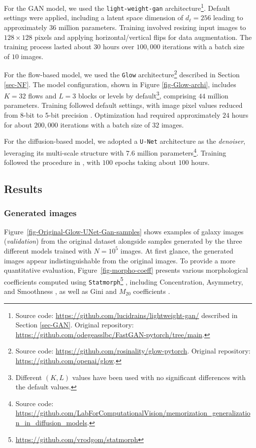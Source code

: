 \documentclass[fleqn,usenatbib]{mnras}
\begin{document}
For the GAN model, we used the \texttt{light-weight-gan} architecture\footnote{Source code: \url{https://github.com/lucidrains/lightweight-gan/} described in Section \ref{sec-GAN}. Original repository: \url{https://github.com/odegeasslbc/FastGAN-pytorch/tree/main}.}. Default settings were applied, including a latent space dimension of $d_\ell=256$ leading to approximately $36$ million parameters. Training involved resizing input images to $128 \times 128$ pixels and applying horizontal/vertical flips for data augmentation. The training process lasted about $30$ hours over $100,000$ iterations with a batch size of $10$ images.

For the flow-based model, we used the \texttt{Glow} architecture\footnote{Source code: \url{https://github.com/rosinality/glow-pytorch}. Original repository: \url{https://github.com/openai/glow}.} described in Section \ref{sec-NF}. The model configuration, shown in Figure \ref{fig-Glow-archi}, includes $K=32$ flows and $L=3$ blocks or levels by default\footnote{Different $(K,L)$ values have been used with no significant differences with the default values.}, comprising $44$ million parameters. Training followed default settings, with image pixel values reduced from 8-bit to 5-bit precision \citep{Kingma2018}. Optimization had required approximately $24$ hours for about $200,000$ iterations with a batch size of $32$ images.

For the diffusion-based model, we adopted a \texttt{U-Net} architecture \citep{ronneberger2015u} as the \textit{denoiser}, leveraging its multi-scale structure with $7.6$ million parameters\footnote{Source code: \url{https://github.com/LabForComputationalVision/memorization_generalization_in_diffusion_models}.}. Training followed the procedure in \cite{kadkhodaie2024generalization}, with $100$ epochs taking about $100$ hours.
%
\subsection{Results}
\label{sec-Results}
%
\subsubsection{Generated images}
\label{sec-Generated-Images}
%
Figure~\ref{fig-Original-Glow-UNet-Gan-samples} shows examples of galaxy images (\textit{validation}) from the original dataset alongside samples generated by the three different models trained with $N = 10^5$ images.
%
%
At first glance, the generated images appear indistinguishable from the original images. To provide a more quantitative evaluation, Figure~\ref{fig-morpho-coeff} presents various morphological coefficients computed using \texttt{Statmorph}\footnote{\url{https://github.com/vrodgom/statmorph}} \citep{2019MNRAS.483.4140R}, including Concentration, Asymmetry, and Smoothness \citep{2000AJ....119.2645B,2003ApJS..147....1C,2004AJ....128..163L}, as well as Gini and $M_{20}$ coefficients \citep{2004AJ....128..163L,10.1093/mnras/stv2078}.
\end{document}
